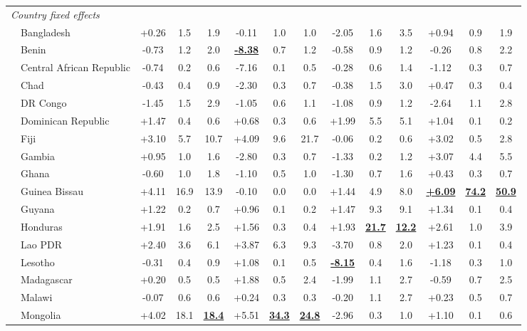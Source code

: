 \begin{landscape}
\begin{table}[p]
\begin{adjustbox}{max width=\textwidth,center}
\begin{tabular}{ll*{12}{c}}
\multicolumn{14}{l}{\textit{Country fixed effects}} \\
 & Bangladesh & +0.26 & 1.5 & 1.9 & -0.11 & 1.0 & 1.0 & -2.05 & 1.6 & 3.5 & +0.94 & 0.9 & 1.9 \\
 & Benin & -0.73 & 1.2 & 2.0 & \textbf{\underline{-8.38}} & 0.7 & 1.2 & -0.58 & 0.9 & 1.2 & -0.26 & 0.8 & 2.2 \\
 & Central African Republic & -0.74 & 0.2 & 0.6 & -7.16 & 0.1 & 0.5 & -0.28 & 0.6 & 1.4 & -1.12 & 0.3 & 0.7 \\
 & Chad & -0.43 & 0.4 & 0.9 & -2.30 & 0.3 & 0.7 & -0.38 & 1.5 & 3.0 & +0.47 & 0.3 & 0.4 \\
 & DR Congo & -1.45 & 1.5 & 2.9 & -1.05 & 0.6 & 1.1 & -1.08 & 0.9 & 1.2 & -2.64 & 1.1 & 2.8 \\
 & Dominican Republic & +1.47 & 0.4 & 0.6 & +0.68 & 0.3 & 0.6 & +1.99 & 5.5 & 5.1 & +1.04 & 0.1 & 0.2 \\
 & Fiji & +3.10 & 5.7 & 10.7 & +4.09 & 9.6 & 21.7 & -0.06 & 0.2 & 0.6 & +3.02 & 0.5 & 2.8 \\
 & Gambia & +0.95 & 1.0 & 1.6 & -2.80 & 0.3 & 0.7 & -1.33 & 0.2 & 1.2 & +3.07 & 4.4 & 5.5 \\
 & Ghana & -0.60 & 1.0 & 1.8 & -1.10 & 0.5 & 1.0 & -1.30 & 0.7 & 1.6 & +0.43 & 0.3 & 0.7 \\
 & Guinea Bissau & +4.11 & 16.9 & 13.9 & -0.10 & 0.0 & 0.0 & +1.44 & 4.9 & 8.0 & \textbf{\underline{+6.09}} & \textbf{\underline{74.2}} & \textbf{\underline{50.9}} \\
 & Guyana & +1.22 & 0.2 & 0.7 & +0.96 & 0.1 & 0.2 & +1.47 & 9.3 & 9.1 & +1.34 & 0.1 & 0.4 \\
 & Honduras & +1.91 & 1.6 & 2.5 & +1.56 & 0.3 & 0.4 & +1.93 & \textbf{\underline{21.7}} & \textbf{\underline{12.2}} & +2.61 & 1.0 & 3.9 \\
 & Lao PDR & +2.40 & 3.6 & 6.1 & +3.87 & 6.3 & 9.3 & -3.70 & 0.8 & 2.0 & +1.23 & 0.1 & 0.4 \\
 & Lesotho & -0.31 & 0.4 & 0.9 & +1.08 & 0.1 & 0.5 & \textbf{\underline{-8.15}} & 0.4 & 1.6 & -1.18 & 0.3 & 1.0 \\
 & Madagascar & +0.20 & 0.5 & 0.5 & +1.88 & 0.5 & 2.4 & -1.99 & 1.1 & 2.7 & -0.59 & 0.7 & 2.5 \\
 & Malawi & -0.07 & 0.6 & 0.6 & +0.24 & 0.3 & 0.3 & -0.20 & 1.1 & 2.7 & +0.23 & 0.5 & 0.7 \\
 & Mongolia & +4.02 & 18.1 & \textbf{\underline{18.4}} & +5.51 & \textbf{\underline{34.3}} & \textbf{\underline{24.8}} & -2.96 & 0.3 & 1.0 & +1.10 & 0.1 & 0.6 \\

\end{tabular}
\end{adjustbox}
\end{table}
\end{landscape}
